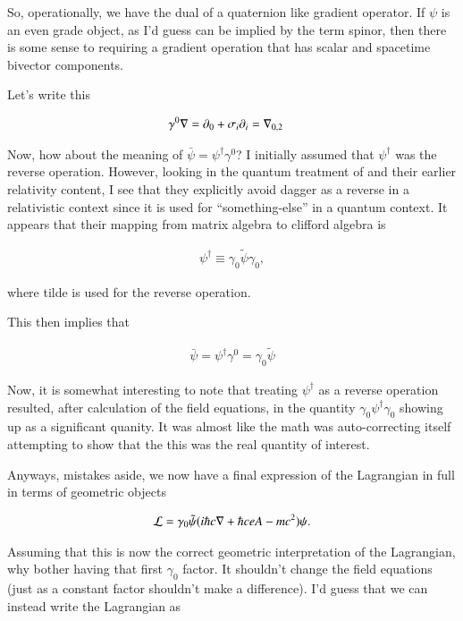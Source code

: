 \documentclass{article}
\begin{document}
So, operationally, we have the dual of a quaternion like gradient operator.  If $\psi$ is an even grade object, as I'd guess can be implied by
the term spinor, then there is some sense to requiring a gradient operation that has scalar and spacetime bivector components.

Let's write this

\begin{align*}
\gamma^0 \nabla &= \partial_0 + \sigma_i \partial_i = {\nabla}_{0,2}
\end{align*}

Now, how about the meaning of $\bar\psi = \psi^\dagger \gamma^0$?  I initially assumed that $\psi^\dagger$ was the reverse operation.
However, looking in the quantum treatment of \cite{doran2003gap} and their earlier relativity content, I see that they explicitly avoid dagger as a reverse in a relativistic context since it is used for ``something-else'' in a quantum context.  It appears that their mapping from matrix algebra to clifford 
algebra is 

\begin{align*}
\psi^\dagger \equiv \gamma_0 \tilde{\psi} \gamma_0,
\end{align*}

where tilde is used for the reverse operation.

This then implies that 

\begin{align*}
\bar \psi = \psi^\dagger \gamma^0 = \gamma_0 \tilde{\psi}
\end{align*}

Now, it is somewhat interesting to note that treating $\psi^\dagger$ as a reverse operation resulted, after calculation of the field equations, in the quantity $\gamma_0 \psi^\dagger \gamma_0$ showing up as a significant quanity.  It was almost like the math was auto-correcting itself attempting to show that the this was the real quantity of interest.

Anyways, mistakes aside, we now have a final expression of the Lagrangian in full in terms of geometric objects

\begin{align}\label{eqn:lag2}
\mathcal{L} = \gamma_0 \tilde{\psi} ( i \hbar c \nabla + \hbar c e A - mc^2) \psi.
\end{align}

Assuming that this is now the correct geometric interpretation of the Lagrangian, why bother having that first $\gamma_0$ factor.  It shouldn't change the field equations (just as a constant factor shouldn't make a difference).  I'd guess that we can instead write the Lagrangian as
\end{document}

